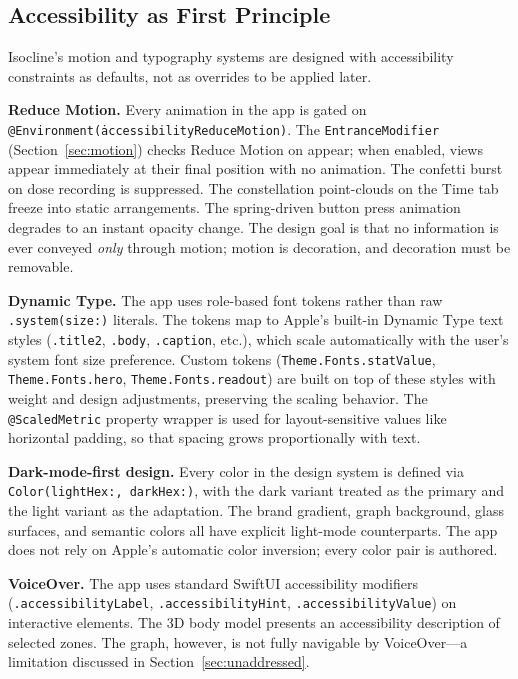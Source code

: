 \documentclass[11pt,a4paper]{article}
\newcommand{\code}[1]{\texttt{\small #1}}
\begin{document}
\subsection{Accessibility as First Principle}
\label{sec:accessibility}

Isocline's motion and typography systems are designed with accessibility
constraints as defaults, not as overrides to be applied later.

\textbf{Reduce Motion.} Every animation in the app is gated on
\code{@Environment(\.accessibilityReduceMotion)}. The
\code{EntranceModifier} (Section~\ref{sec:motion}) checks Reduce Motion
on appear; when enabled, views appear immediately at their final position
with no animation. The confetti burst on dose recording is suppressed.
The constellation point-clouds on the Time tab freeze into static
arrangements. The spring-driven button press animation degrades to an
instant opacity change. The design goal is that no information is ever
conveyed \emph{only} through motion; motion is decoration, and
decoration must be removable.

\textbf{Dynamic Type.} The app uses role-based font tokens rather than
raw \code{.system(size:)} literals. The tokens map to Apple's built-in
Dynamic Type text styles (\code{.title2}, \code{.body}, \code{.caption},
etc.), which scale automatically with the user's system font size
preference. Custom tokens (\code{Theme.Fonts.statValue},
\code{Theme.Fonts.hero}, \code{Theme.Fonts.readout}) are built on top of
these styles with weight and design adjustments, preserving the scaling
behavior. The \code{@ScaledMetric} property wrapper is used for
layout-sensitive values like horizontal padding, so that spacing grows
proportionally with text.

\textbf{Dark-mode-first design.} Every color in the design system is
defined via \code{Color(lightHex:, darkHex:)}, with the dark variant
treated as the primary and the light variant as the adaptation. The
brand gradient, graph background, glass surfaces, and semantic colors all
have explicit light-mode counterparts. The app does not rely on
Apple's automatic color inversion; every color pair is authored.

\textbf{VoiceOver.} The app uses standard SwiftUI accessibility modifiers
(\code{.accessibilityLabel}, \code{.accessibilityHint},
\code{.accessibilityValue}) on interactive elements. The 3D body model
presents an accessibility description of selected zones. The graph,
however, is not fully navigable by VoiceOver---a limitation discussed in
Section~\ref{sec:unaddressed}.
\end{document}

